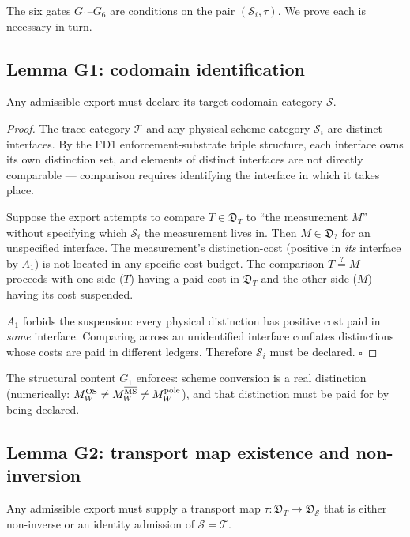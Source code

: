 The six gates $G_1$--$G_6$ are conditions on the pair $(\mathcal{S}_i, \tau)$. We prove each is necessary in turn.

\subsection{Lemma G1: codomain identification}
\label{subsec:lemma-G1}

\begin{lemma}
\label{lem:G1}
Any admissible export must declare its target codomain category $\mathcal{S}$.
\end{lemma}

\begin{proof}
The trace category $\mathcal{T}$ and any physical-scheme category $\mathcal{S}_i$ are distinct interfaces. By the FD1 enforcement-substrate triple structure, each interface owns its own distinction set, and elements of distinct interfaces are not directly comparable --- comparison requires identifying the interface in which it takes place.

Suppose the export attempts to compare $T \in \mathfrak{D}_T$ to ``the measurement $M$'' without specifying which $\mathcal{S}_i$ the measurement lives in. Then $M \in \mathfrak{D}_?$ for an unspecified interface. The measurement's distinction-cost (positive in \emph{its} interface by $A_1$) is not located in any specific cost-budget. The comparison $T \stackrel{?}{=} M$ proceeds with one side ($T$) having a paid cost in $\mathfrak{D}_T$ and the other side ($M$) having its cost suspended.

$A_1$ forbids the suspension: every physical distinction has positive cost paid in \emph{some} interface. Comparing across an unidentified interface conflates distinctions whose costs are paid in different ledgers. Therefore $\mathcal{S}_i$ must be declared. $\square$
\end{proof}

The structural content $G_1$ enforces: scheme conversion is a real distinction (numerically: $M_W^{\rm OS} \ne M_W^{\overline{\rm MS}} \ne M_W^{\rm pole}$), and that distinction must be paid for by being declared.

\subsection{Lemma G2: transport map existence and non-inversion}
\label{subsec:lemma-G2}

\begin{lemma}
\label{lem:G2}
Any admissible export must supply a transport map $\tau: \mathfrak{D}_T \to \mathfrak{D}_{\mathcal{S}}$ that is either non-inverse or an identity admission of $\mathcal{S} = \mathcal{T}$.
\end{lemma}

